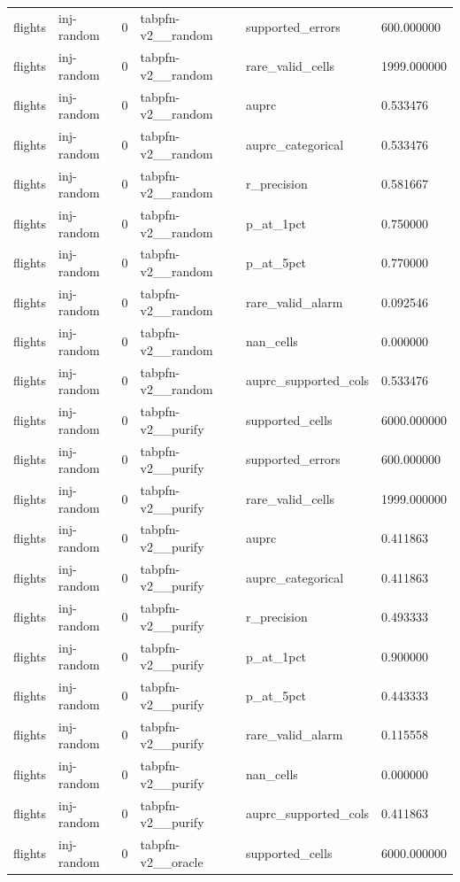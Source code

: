 \begin{tabular}{llllll}
flights & inj-random & 0 & tabpfn-v2\_\_random & supported\_errors & 600.000000 \\
flights & inj-random & 0 & tabpfn-v2\_\_random & rare\_valid\_cells & 1999.000000 \\
flights & inj-random & 0 & tabpfn-v2\_\_random & auprc & 0.533476 \\
flights & inj-random & 0 & tabpfn-v2\_\_random & auprc\_categorical & 0.533476 \\
flights & inj-random & 0 & tabpfn-v2\_\_random & r\_precision & 0.581667 \\
flights & inj-random & 0 & tabpfn-v2\_\_random & p\_at\_1pct & 0.750000 \\
flights & inj-random & 0 & tabpfn-v2\_\_random & p\_at\_5pct & 0.770000 \\
flights & inj-random & 0 & tabpfn-v2\_\_random & rare\_valid\_alarm & 0.092546 \\
flights & inj-random & 0 & tabpfn-v2\_\_random & nan\_cells & 0.000000 \\
flights & inj-random & 0 & tabpfn-v2\_\_random & auprc\_supported\_cols & 0.533476 \\
flights & inj-random & 0 & tabpfn-v2\_\_purify & supported\_cells & 6000.000000 \\
flights & inj-random & 0 & tabpfn-v2\_\_purify & supported\_errors & 600.000000 \\
flights & inj-random & 0 & tabpfn-v2\_\_purify & rare\_valid\_cells & 1999.000000 \\
flights & inj-random & 0 & tabpfn-v2\_\_purify & auprc & 0.411863 \\
flights & inj-random & 0 & tabpfn-v2\_\_purify & auprc\_categorical & 0.411863 \\
flights & inj-random & 0 & tabpfn-v2\_\_purify & r\_precision & 0.493333 \\
flights & inj-random & 0 & tabpfn-v2\_\_purify & p\_at\_1pct & 0.900000 \\
flights & inj-random & 0 & tabpfn-v2\_\_purify & p\_at\_5pct & 0.443333 \\
flights & inj-random & 0 & tabpfn-v2\_\_purify & rare\_valid\_alarm & 0.115558 \\
flights & inj-random & 0 & tabpfn-v2\_\_purify & nan\_cells & 0.000000 \\
flights & inj-random & 0 & tabpfn-v2\_\_purify & auprc\_supported\_cols & 0.411863 \\
flights & inj-random & 0 & tabpfn-v2\_\_oracle & supported\_cells & 6000.000000 \\

\end{tabular}
